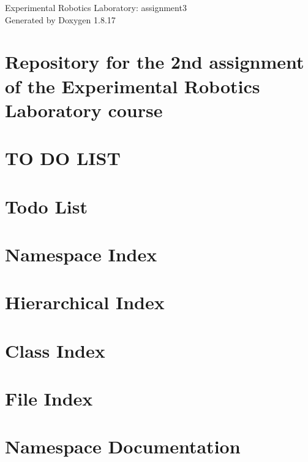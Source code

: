 \let\mypdfximage\pdfximage\def\pdfximage{\immediate\mypdfximage}\documentclass[twoside]{book}
\newcommand{\+}{\discretionary{\mbox{\scriptsize$\hookleftarrow$}}{}{}}
\newcommand{\clearemptydoublepage}{%
  \newpage{\pagestyle{empty}\cleardoublepage}%
}
\begin{document}
\hypersetup{pageanchor=false,
             bookmarksnumbered=true,
             pdfencoding=unicode
            }
\begin{titlepage}
\vspace*{7cm}
\begin{center}%
{\Large Experimental Robotics Laboratory\+: assignment3 }\\
\vspace*{1cm}
{\large Generated by Doxygen 1.8.17}\\
\end{center}
\end{titlepage}
\clearemptydoublepage
{}
\tableofcontents
\clearemptydoublepage
{}
\hypersetup{pageanchor=true}

\chapter{Repository for the 2nd assignment of the Experimental Robotics Laboratory course}
\label{md_erl2__r_e_a_d_m_e}

\chapter{TO DO L\+I\+ST}
\label{md__r_e_a_d_m_e}

\chapter{Todo List}
\label{todo}

\chapter{Namespace Index}

\chapter{Hierarchical Index}

\chapter{Class Index}

\chapter{File Index}

\chapter{Namespace Documentation}







\end{document}
